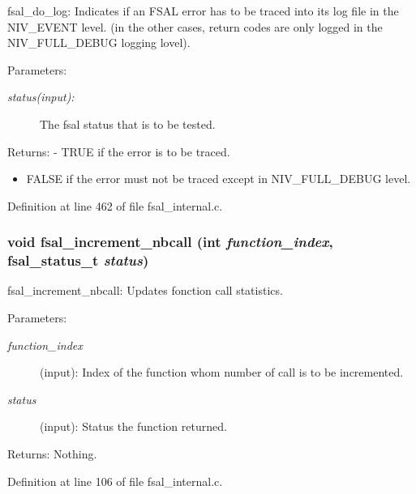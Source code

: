 fsal\_\-do\_\-log: Indicates if an FSAL error has to be traced into its log file in the NIV\_\-EVENT level. (in the other cases, return codes are only logged in the NIV\_\-FULL\_\-DEBUG logging lovel).

\begin{Desc}
\item[Parameters:]
\begin{description}
\item[{\em status(input):}]The fsal status that is to be tested.\end{description}
\end{Desc}
\begin{Desc}
\item[Returns:]- TRUE if the error is to be traced.\begin{itemize}
\item FALSE if the error must not be traced except in NIV\_\-FULL\_\-DEBUG level. \end{itemize}
\end{Desc}


Definition at line 462 of file fsal\_\-internal.c.
\subsubsection{\setlength{\rightskip}{0pt plus 5cm}void fsal\_\-increment\_\-nbcall (int {\em function\_\-index}, fsal\_\-status\_\-t {\em status})}\label{fsal__internal_8c_a14}


fsal\_\-increment\_\-nbcall: Updates fonction call statistics.

\begin{Desc}
\item[Parameters:]
\begin{description}
\item[{\em function\_\-index}](input): Index of the function whom number of call is to be incremented. \item[{\em status}](input): Status the function returned.\end{description}
\end{Desc}
\begin{Desc}
\item[Returns:]Nothing. \end{Desc}


Definition at line 106 of file fsal\_\-internal.c.

